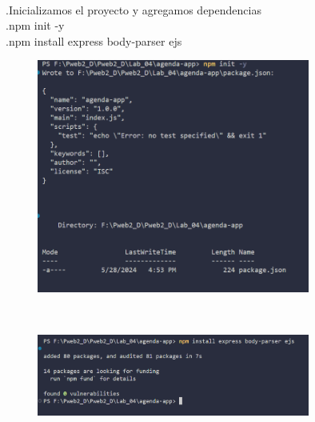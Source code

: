\documentclass{article}
\begin{document}
\\.Inicializamos el proyecto y agregamos dependencias
\\.npm init -y
\\.npm install express body-parser ejs



    \begin{figure}[H]
		          \centering
		          \includegraphics[width=0.8\textwidth,keepaspectratio]                       {img/dep1Agenda.png}
    \end{figure}
\\
    \begin{figure}[H]
		          \centering
		          \includegraphics[width=0.8\textwidth,keepaspectratio]                       {img/dep2Agenda.png}
    \end{figure}

\\    
\end{document}

